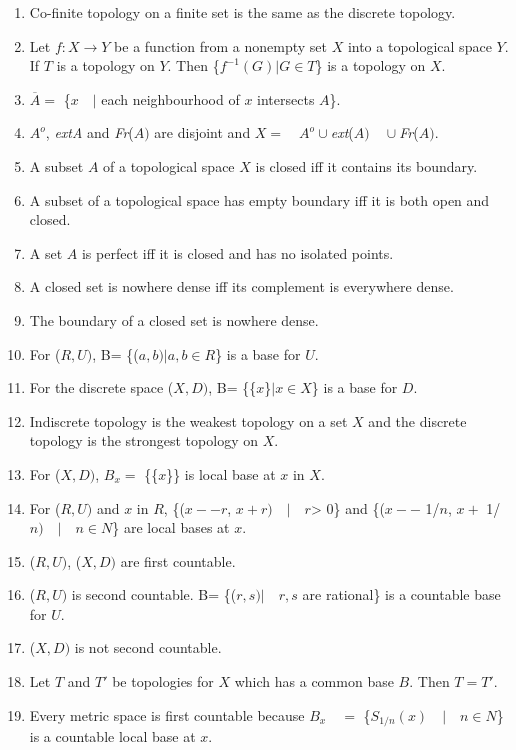 \documentclass[12pt]{amsart}
\begin{document}
\begin{enumerate}
\item Co-finite topology on a finite set is the same as the discrete topology.
\item Let $f : X \to Y$ be a function from a nonempty set $X$ into a topological space $Y$. If $T$ is a topology on $Y$. Then {\{}$f ^{-1}(G)\vert G\in T${\}} is a topology on $X$.
\item $\overline A =$ {\{}$x \quad \vert $ each neighbourhood of $x$ intersects $A${\}}.
\item $A^{o}$, \textit{extA} and \textit{Fr}($A)$ are disjoint and $X = \quad A^{o}\cup $\textit{ext}($A) \quad \cup $\textit{Fr}($A)$.
\item A subset $A$ of a topological space $X$ is closed iff it contains its boundary.
\item A subset of a topological space has empty boundary iff it is both open and closed.
\item A set $A$ is perfect iff it is closed and has no isolated points.
\item A closed set is nowhere dense iff its complement is everywhere dense.
\item The boundary of a closed set is nowhere dense.
\item For ($R, U)$, B= {\{}($a, b)\vert a, b\in R${\}} is a base for $U$.
\item For the discrete space ($X, D)$, B= {\{}{\{}$x${\}}$\vert x\in X${\}} is a base for $D$.
\item Indiscrete topology is the weakest topology on a set $X$ and the discrete topology is the strongest topology on $X.$
\item For ($X, D)$, $B_{x} =$ {\{}{\{}$x${\}}{\}} is local base at $x$ in $X$.
\item For ($R, U)$ and $x$ in $R$, {\{}($x -- r$, $x +r) \quad \vert  \quad r $> 0{\}} and {\{}($x --$ 1/$n$, $x +$ 1/$n) \quad \vert  \quad n\in N${\}} are local bases at $x$.
\item ($R, U)$, ($X, D)$ are first countable.
\item ($R, U)$ is second countable. B= {\{}($r, s)\vert  \quad r, s$ are rational{\}} is a countable base for $U$.
\item ($X, D)$ is not second countable.
\item Let $T$ and $T'$ be topologies for $X$ which has a common base $B$. Then $T = T'$.
\item Every metric space is first countable because $B_{x} \quad =$ {\{}$S_{1/n}(x) \quad \vert  \quad n\in N${\}} is a countable local base at $x$.

\end{enumerate}
\end{document}
